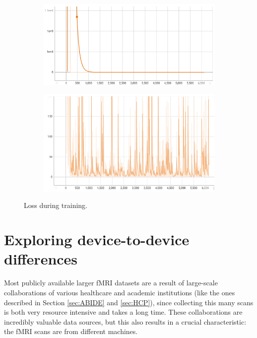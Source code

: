 		\begin{figure}[!h]
		\centering
		\begin{subfigure}[b]{0.45\textwidth}
			\centering
			\includegraphics[width=\textwidth]{figures/train-loss.png}
		\end{subfigure}
		\hfill
		\begin{subfigure}[b]{0.45\textwidth}
			\centering
			\includegraphics[width=\textwidth]{figures/step-loss.png}
		\end{subfigure}
		\caption{Loss during training.}
		\label{fig:loss}
	\end{figure}

\section{Exploring device-to-device differences}

	Most publicly available larger fMRI datasets are a result of large-scale collaborations of various healthcare and academic institutions (like the ones described in Section \ref{sec:ABIDE} and \ref{sec:HCP}), since collecting this many scans is both very resource intensive and takes a long time. These collaborations are incredibly valuable data sources, but this also results in a crucial characteristic: the fMRI scans are from different machines.
	
